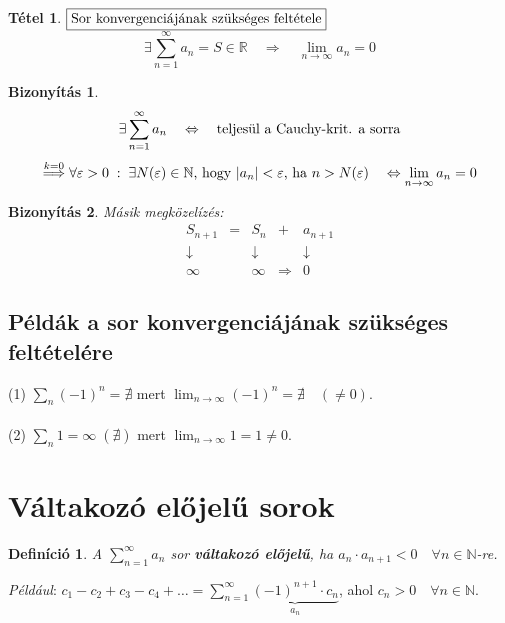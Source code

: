 \documentclass[a4paper,12pt,twoside]{book}
\newtheorem{tetel}{Tétel}[chapter]
\newtheorem{defi}{Definíció}[chapter]
\theoremstyle{break}
\newtheorem{biz}{Bizonyítás}[chapter]
\theoremstyle{plain}
\begin{document}
\begin{tetel}$\boxed{$Sor konvergenciájának szükséges feltétele$}$\\
\[\exists\sum^\infty_{n=1} a_n = S\in\mathbb{R} \quad \Rightarrow \quad \lim_{n\to\infty} a_n = 0\]
\end{tetel}
\begin{biz}
\[\exists\sum^\infty_{n=1} a_n \quad\Leftrightarrow\quad \hbox{teljesül a Cauchy-krit. a sorra}\]
\[\overset{k=0}{\Longrightarrow} \forall\varepsilon > 0 \;:\; \exists N(\varepsilon)\in\mathbb{N}\hbox{, hogy } |a_n|<\varepsilon\hbox{, ha } n>N(\varepsilon) \quad \Leftrightarrow \lim_{n\to\infty} a_n = 0\]
\end{biz}

\addtocounter{biz}{-1}
\begin{biz} Másik megközelízés:
\[\begin{array}{ccccc}
S_{n+1} &=& S_n & + & a_{n+1} \\
\downarrow && \downarrow&& \downarrow\\
\infty && \infty &\Rightarrow& 0
  \end{array}\]
\end{biz}

\subsection{Példák a sor konvergenciájának szükséges feltételére}

(1) $\displaystyle \sum_{n} (-1)^n = \nexists$ mert $\displaystyle \lim_{n\to\infty} (-1)^n = \nexists \quad (\boxed{\neq 0})$.\\
\\
(2) $\displaystyle \sum_{n} 1 = \infty \; (\nexists)$ mert $\displaystyle \lim_{n\to\infty} 1 = 1 \boxed{\neq 0}$.

\section{Váltakozó előjelű sorok}

\begin{defi}
 A $\displaystyle \sum^\infty_{n=1} a_n$ sor \textbf{váltakozó előjelű}, ha $a_n\cdot a_{n+1}<0 \quad \forall n\in\mathbb{N}$-re.
\end{defi}
\emph{Például}: $\displaystyle c_1-c_2+c_3-c_4+\ldots = \sum^\infty_{n=1} \underbrace{(-1)^{n+1}\cdot c_n}_{a_n}$, ahol $c_n>0 \quad \forall n\in\mathbb{N}$.
\end{document}
